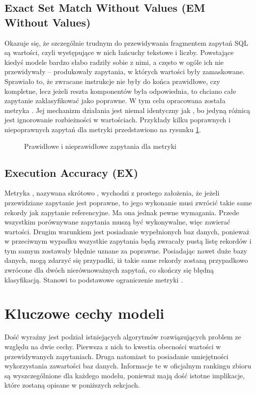 \subsection{Exact Set Match Without Values (EM Without Values)}
Okazuje się, że szczególnie trudnym do przewidywania fragmentem zapytań SQL są wartości, czyli występujące w nich łańcuchy tekstowe i liczby. Powstające kiedyś modele bardzo słabo radziły sobie z nimi, a często w ogóle ich nie przewidywały -- produkowały zapytania, w których wartości były zamaskowane. Sprawiało to, że zwracane instrukcje nie były do końca prawidłowe, czy kompletne, lecz jeżeli reszta komponentów była odpowiednia, to chciano całe zapytanie zaklasyfikować jako poprawne. W tym celu opracowana została metryka . Jej mechanizm działania jest niemal identyczny jak , bo jedyną różnicą jest ignorowanie rozbieżności w wartościach. Przykłady kilku poprawnych i niepoprawnych zapytań dla metryki  przedstawiono na rysunku \ref{fig:em-without-values}.

\begin{figure}[ht!]
  \centering
  
  \caption{Prawidłowe i nieprawidłowe zapytania dla metryki }
  \label{fig:em-without-values}
\end{figure}

\subsection{Execution Accuracy (EX)}
\label{text:execution_accuracy}
Metryka , nazywana skrótowo , wychodzi z prostego założenia, że jeżeli przewidziane zapytanie jest poprawne, to jego wykonanie musi zwrócić takie same rekordy jak zapytanie referencyjne. Ma ona jednak pewne wymagania. Przede wszystkim porównywane zapytania muszą być wykonywalne, więc zawierać wartości. Drugim warunkiem jest posiadanie wypełnionych baz danych, ponieważ w przeciwnym wypadku wszystkie zapytania będą zwracały pustą listę rekordów i tym samym zostawały błędnie uznane za poprawne. Posiadając nawet duże bazy danych, mogą zdarzyć się przypadki, iż takie same rekordy zostaną przypadkowo zwrócone dla dwóch nierównoważnych zapytań, co skończy się błędną klasyfikacją. Stanowi to podstawowe ograniczenie metryki .

\section{Kluczowe cechy modeli}
Dość wyraźny jest podział istniejących algorytmów rozwiązujących problem  ze względu na dwie cechy. Pierwsza z nich to kwestia obecności wartości w przewidywanych zapytaniach. Druga natomiast to posiadanie umiejętności wykorzystania zawartości baz danych. Informacje te w oficjalnym rankingu zbioru  są wyszczególnione dla każdego modelu, ponieważ mają dość istotne implikacje, które zostaną opisane w poniższych sekcjach.

